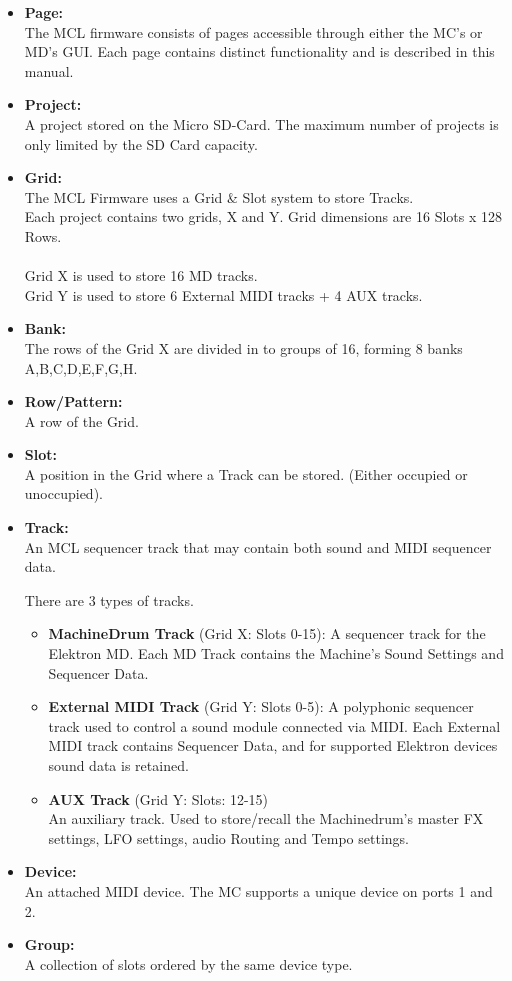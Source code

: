 \begin{itemize}
\item \textbf{Page:}
\\
The MCL firmware consists of pages accessible through either the MC's or MD's GUI. Each page contains distinct functionality and is described in this manual.
\item \textbf{Project:}
\\
A project stored on the Micro SD-Card.
The maximum number of projects is only limited by the SD Card capacity.

\item \textbf{Grid:}
\\
The MCL Firmware uses a Grid \& Slot system to store Tracks.\\
Each project contains two grids, X and Y. Grid dimensions are 16 Slots x 128 Rows.\\
\\
Grid X is used to store 16 MD tracks.\\Grid Y is used to store 6 External MIDI tracks + 4 AUX tracks.
\item \textbf{Bank:}\\
The rows of the Grid X are divided in to groups of 16, forming 8 banks A,B,C,D,E,F,G,H.
\item \textbf{Row/Pattern:}
\\
A row of the Grid.

\item \textbf{Slot:}
\\
A position in the Grid where a Track can be stored. (Either occupied or unoccupied).
\item \textbf{Track:}
\\
An MCL sequencer track that may contain both sound and MIDI sequencer data.

There are 3 types of tracks.
\begin{itemize}

\item \textbf{MachineDrum Track} (Grid X: Slots 0-15):
A sequencer track for the Elektron MD. Each MD Track contains the Machine's Sound Settings and Sequencer Data.

\item \textbf{External MIDI Track} (Grid Y: Slots 0-5):
A polyphonic sequencer track used to control a sound module connected via MIDI. Each External MIDI track contains Sequencer Data, and for supported Elektron devices sound data is retained. 

\item \textbf{AUX Track} (Grid Y: Slots: 12-15)\\
An auxiliary track. Used to store/recall the Machinedrum's master FX settings, LFO settings, audio Routing and Tempo settings.
\end{itemize}

\item \textbf{Device:}\\
An attached MIDI device. The MC supports a unique device on ports 1 and 2.

\item \textbf{Group:}
\\
A collection of slots ordered by the same device type.

\end{itemize}